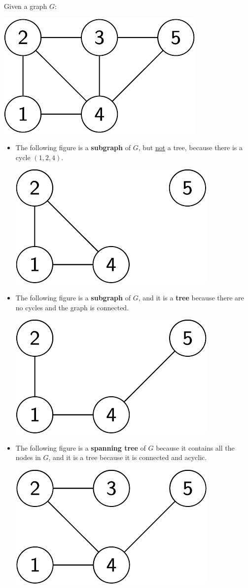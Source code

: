 \begin{examplebox}
    Given a graph $G$:
    \begin{center}
        \includegraphics[width=.3\textwidth]{img/trees-1.pdf}
    \end{center}

    \begin{itemize}
        \item The following figure is a \textbf{subgraph} of $G$, but \underline{not} a tree, because there is a cycle $\left(1,2,4\right)$.
        \begin{center}
            \includegraphics[width=.3\textwidth]{img/trees-2.pdf}
        \end{center}

        \item The following figure is a \textbf{subgraph} of $G$, and it is a \textbf{tree} because there are no cycles and the graph is connected.
        \begin{center}
            \includegraphics[width=.3\textwidth]{img/trees-3.pdf}
        \end{center}
        
        \item The following figure is a \textbf{spanning tree} of $G$ because it contains all the nodes in $G$, and it is a tree because it is connected and acyclic.
        \begin{center}
            \includegraphics[width=.3\textwidth]{img/trees-4.pdf}
        \end{center}
    \end{itemize}
\end{examplebox}


